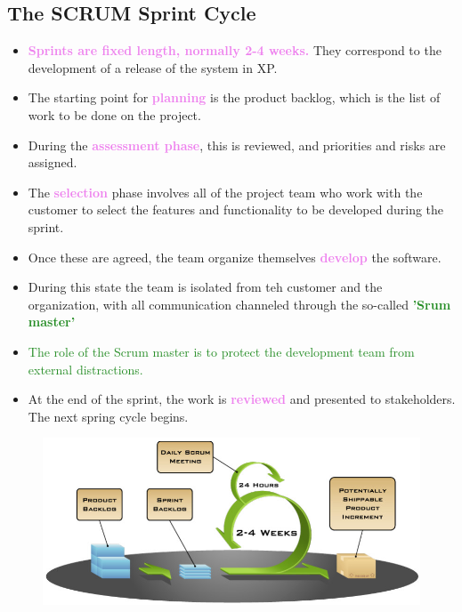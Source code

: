 \documentclass{report}
\newcommand{\textg}[1]{\textcolor{ForestGreen}{#1}}
\newcommand{\textv}[1]{\textcolor{violet}{#1}}
\newcommand{\textbfg}[1]{\textbf{\textg{#1}}}
\newcommand{\textbfv}[1]{\textbf{\textv{#1}}}
\begin{document}
\subsection{The SCRUM Sprint Cycle}
\begin{itemize}
  \item \textbfv{Sprints are fixed length, normally 2-4 weeks.} They correspond to the development of a release of the system in XP.
  \item The starting point for \textbfv{planning} is the product backlog, which is the list of work to be done on the project.
  \item During the \textbfv{assessment phase}, this is reviewed, and priorities and risks are assigned.
  \item The \textbfv{selection} phase involves all of the project team who work with the customer to select the features and functionality to be developed during the sprint.
  \item Once these are agreed, the team organize themselves \textbfv{develop} the software.
  \item During this state the team is isolated from teh customer and the organization, with all communication channeled through the so-called \textbfg{'Srum master'}
  \item \textg{The role of the Scrum master is to protect the development team from external distractions.}
  \item At the end of the sprint, the work is \textbfv{reviewed} and presented to stakeholders. The next spring cycle begins.
\end{itemize}
\begin{figure}[H]
\centering
\includegraphics[scale=.5,trim=1cm 1cm 1cm 1cm]{assets/CEN4010_Scrum_Overview.jpg}
\end{figure}
\end{document}
